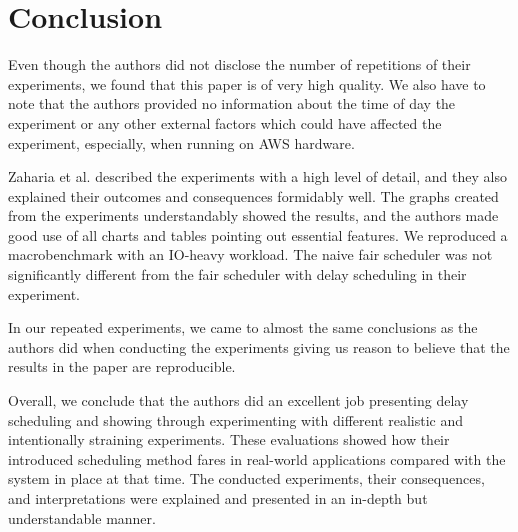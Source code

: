 \section{Conclusion}

Even though the authors did not disclose the number of repetitions of their experiments, we found that this paper is of very high quality. We also have to note that the authors provided no information about the time of day the experiment or any other external factors which could have affected the experiment, especially, when running on AWS hardware.

Zaharia et al. described the experiments with a high level of detail, and they also explained their outcomes and consequences formidably well. The graphs created from the experiments understandably showed the results, and the authors made good use of all charts and tables pointing out essential features. We reproduced a macrobenchmark with an IO-heavy workload. The naive fair scheduler was not significantly different from the fair scheduler with delay scheduling in their experiment.

In our repeated experiments, we came to almost the same conclusions as the authors did when conducting the experiments giving us reason to believe that the results in the paper are reproducible.

Overall, we conclude that the authors did an excellent job presenting delay scheduling and showing through experimenting with different realistic and intentionally straining experiments. These evaluations showed how their introduced scheduling method fares in real-world applications compared with the system in place at that time. The conducted experiments, their consequences, and interpretations were explained and presented in an in-depth but understandable manner.
